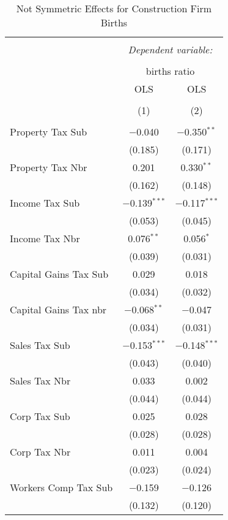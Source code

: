 
\begin{table}[!htbp] \centering 
  \caption{Not Symmetric Effects for  Construction Firm Births} 
  \label{} 
\begin{tabular}{@{\extracolsep{5pt}}lcc} 
\\[-1.8ex]\hline 
\hline \\[-1.8ex] 
 & \multicolumn{2}{c}{\textit{Dependent variable:}} \\ 
\cline{2-3} 
\\[-1.8ex] & \multicolumn{2}{c}{births ratio} \\ 
 & OLS & OLS \\ 
\\[-1.8ex] & (1) & (2)\\ 
\hline \\[-1.8ex] 
 Property Tax Sub & $-$0.040 & $-$0.350$^{**}$ \\ 
  & (0.185) & (0.171) \\ 
  Property Tax Nbr & 0.201 & 0.330$^{**}$ \\ 
  & (0.162) & (0.148) \\ 
  Income Tax Sub & $-$0.139$^{***}$ & $-$0.117$^{***}$ \\ 
  & (0.053) & (0.045) \\ 
  Income Tax Nbr & 0.076$^{**}$ & 0.056$^{*}$ \\ 
  & (0.039) & (0.031) \\ 
  Capital Gains Tax Sub & 0.029 & 0.018 \\ 
  & (0.034) & (0.032) \\ 
  Capital Gains Tax nbr & $-$0.068$^{**}$ & $-$0.047 \\ 
  & (0.034) & (0.031) \\ 
  Sales Tax Sub & $-$0.153$^{***}$ & $-$0.148$^{***}$ \\ 
  & (0.043) & (0.040) \\ 
  Sales Tax Nbr & 0.033 & 0.002 \\ 
  & (0.044) & (0.044) \\ 
  Corp Tax Sub & 0.025 & 0.028 \\ 
  & (0.028) & (0.028) \\ 
  Corp Tax Nbr & 0.011 & 0.004 \\ 
  & (0.023) & (0.024) \\ 
  Workers Comp Tax Sub & $-$0.159 & $-$0.126 \\ 
  & (0.132) & (0.120) \\ 

\end{tabular}
\end{table}
